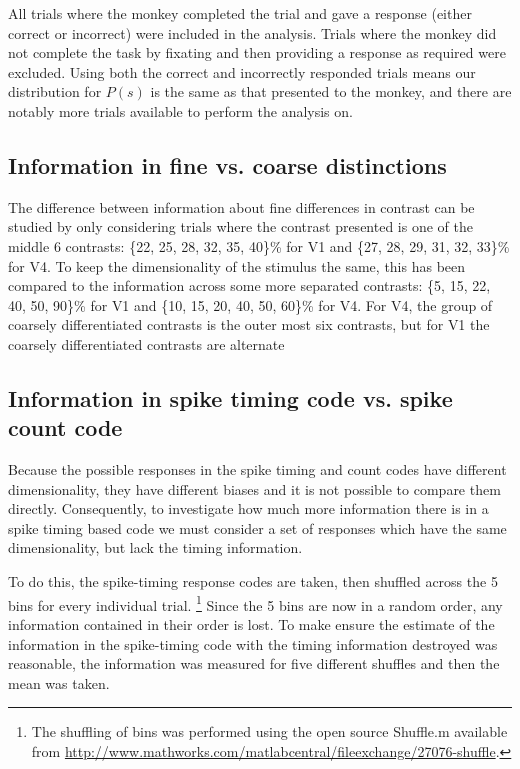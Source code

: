 All trials where the monkey completed the trial and gave a response (either correct or incorrect) were included in the analysis. Trials where the monkey did not complete the task by fixating and then providing a response as required were excluded.
Using both the correct and incorrectly responded trials means our distribution for $P(s)$ is the same as that presented to the monkey, and there are notably more trials available to perform the analysis on.


\FloatBarrier
\subsection{Information in fine vs. coarse distinctions}

The difference between information about fine differences in contrast can be studied by only considering trials where the contrast presented is one of the middle 6 contrasts:
\{22, 25, 28, 32, 35, 40\}\% for \ac{V1} and
\{27, 28, 29, 31, 32, 33\}\% for \ac{V4}.
To keep the dimensionality of the stimulus the same, this has been compared to the information across some more separated contrasts:
 \{5, 15, 22, 40, 50, 90\}\% for \ac{V1} and
\{10, 15, 20, 40, 50, 60\}\% for \ac{V4}.
For \ac{V4}, the group of coarsely differentiated contrasts is the outer most six contrasts, but for \ac{V1} the coarsely differentiated contrasts are alternate

\FloatBarrier
\subsection{Information in spike timing code vs. spike count code}

Because the possible responses in the spike timing and count codes have different dimensionality, they have different biases \cite{Panzeri2007} and it is not possible to compare them directly.
Consequently, to investigate how much more information there is in a spike timing based code we must consider a set of responses which have the same dimensionality, but lack the timing information.

To do this, the spike-timing response codes are taken, then shuffled across the 5 bins for every individual trial.%
\footnote{The shuffling of bins was performed using the open source Shuffle.m
available from \url{http://www.mathworks.com/matlabcentral/fileexchange/27076-shuffle}.}
Since the 5 bins are now in a random order, any information contained in their order is lost. To make ensure the estimate of the information in the spike-timing code with the timing information destroyed was reasonable, the information was measured for five different shuffles%
 and then the mean was taken.

